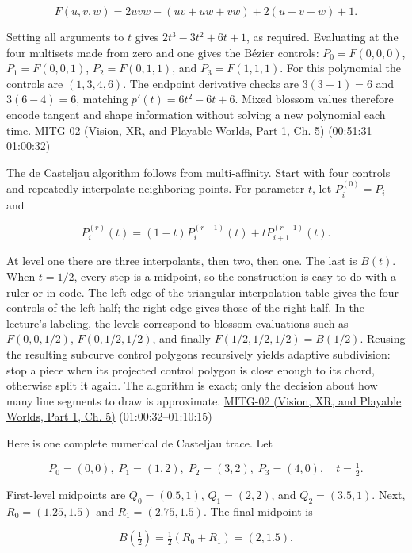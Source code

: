 \[
F(u,v,w)=2uvw-(uv+uw+vw)+2(u+v+w)+1.
\]

Setting all arguments to \(t\) gives \(2t^3-3t^2+6t+1\), as required. Evaluating at the four multisets made from zero and one gives the Bézier controls: \(P_0=F(0,0,0)\), \(P_1=F(0,0,1)\), \(P_2=F(0,1,1)\), and \(P_3=F(1,1,1)\). For this polynomial the controls are \((1,3,4,6)\). The endpoint derivative checks are \(3(3-1)=6\) and \(3(6-4)=6\), matching \(p'(t)=6t^2-6t+6\). Mixed blossom values therefore encode tangent and shape information without solving a new polynomial each time. \href{../07-Vision-XR-and-Playable-Worlds-P01/main.pdf\#04-visual-computing-ii-ch036-mitg-02---cubic-curves}{MITG-02 (Vision, XR, and Playable Worlds, Part 1, Ch. 5)} (00:51:31--01:00:32)

The de Casteljau algorithm follows from multi-affinity. Start with four controls and repeatedly interpolate neighboring points. For parameter \(t\), let \(P_i^{(0)}=P_i\) and

\[
P_i^{(r)}(t)=(1-t)P_i^{(r-1)}(t)+tP_{i+1}^{(r-1)}(t).
\]

At level one there are three interpolants, then two, then one. The last is \(B(t)\). When \(t=1/2\), every step is a midpoint, so the construction is easy to do with a ruler or in code. The left edge of the triangular interpolation table gives the four controls of the left half; the right edge gives those of the right half. In the lecture's labeling, the levels correspond to blossom evaluations such as \(F(0,0,1/2)\), \(F(0,1/2,1/2)\), and finally \(F(1/2,1/2,1/2)=B(1/2)\). Reusing the resulting subcurve control polygons recursively yields adaptive subdivision: stop a piece when its projected control polygon is close enough to its chord, otherwise split it again. The algorithm is exact; only the decision about how many line segments to draw is approximate. \href{../07-Vision-XR-and-Playable-Worlds-P01/main.pdf\#04-visual-computing-ii-ch036-mitg-02---cubic-curves}{MITG-02 (Vision, XR, and Playable Worlds, Part 1, Ch. 5)} (01:00:32--01:10:15)

Here is one complete numerical de Casteljau trace. Let

\[
P_0=(0,0),\; P_1=(1,2),\; P_2=(3,2),\; P_3=(4,0),\quad t=\tfrac12.
\]

First-level midpoints are \(Q_0=(0.5,1)\), \(Q_1=(2,2)\), and \(Q_2=(3.5,1)\). Next, \(R_0=(1.25,1.5)\) and \(R_1=(2.75,1.5)\). The final midpoint is

\[
B(\tfrac12)=\tfrac12(R_0+R_1)=(2,1.5).
\]

